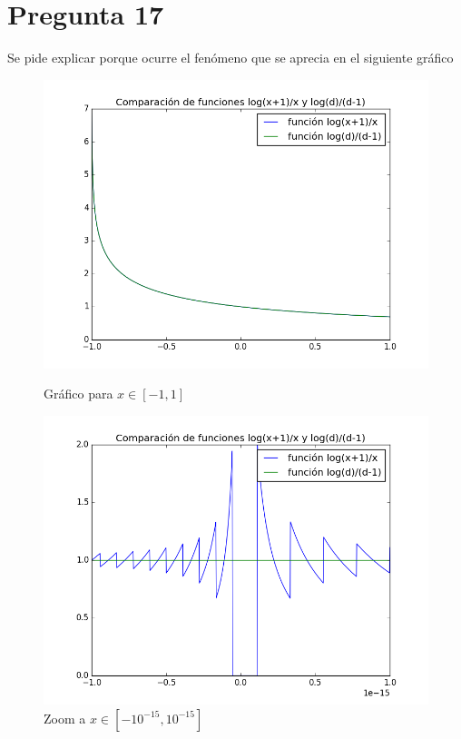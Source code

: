 \documentclass{article}
\begin{document}
\section*{Pregunta 17}
Se pide explicar porque ocurre el fenómeno que se aprecia en el siguiente gráfico
\begin{figure}[h!]
\begin{minipage}{8 cm}
\includegraphics[scale=0.4]{Comparacion_funciones_2.png}
\caption{Gráfico para $x\in [-1,1]$}
\end{minipage}
\begin{minipage}{8 cm}
\includegraphics[scale=0.4]{Comparacion_funciones.png}
\caption{Zoom a $x\in [-10^{-15},10^{-15}]$}
\end{minipage}
\end{figure}
\end{document}
